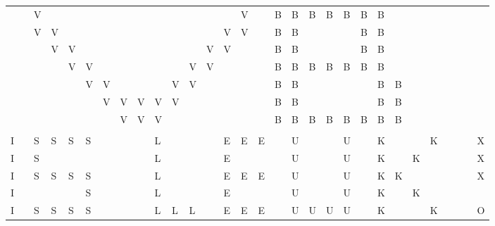 \begin{tabular}{lllllllllllllllllllllllllllll}
&&V&&&&&&&&&&&&V&&B&B&B&B&B&B&B&&&&&&&\\
&&V&V&&&&&&&&&&V&V&&B&B&&&&B&B&&&&&&&\\
&&&V&V&&&&&&&&V&V&&&B&B&&&&B&B&&&&&&&\\
&&&&V&V&&&&&&V&V&&&&B&B&B&B&B&B&B&&&&&&&\\
&&&&&V&V&&&&V&V&&&&&B&B&&&&&B&B&&&&&&\\
&&&&&&V&V&V&V&V&&&&&&B&B&&&&&B&B&&&&&&\\
&&&&&&&V&V&V&&&&&&&B&B&B&B&B&B&B&B&&&&&&\\
&&&&&&&&&&&&&&&&&&&&&&&&&&&&&\\
I&&S&S&S&S&&&&L&&&&E&E&E&&U&&&U&&K&&&K&&&&X\\
I&&S&&&&&&&L&&&&E&&&&U&&&U&&K&&K&&&&&X\\
I&&S&S&S&S&&&&L&&&&E&E&E&&U&&&U&&K&K&&&&&&X\\
I&&&&&S&&&&L&&&&E&&&&U&&&U&&K&&K&&&&&\\
I&&S&S&S&S&&&&L&L&L&&E&E&E&&U&U&U&U&&K&&&K&&&&O\\
\end{tabular}
